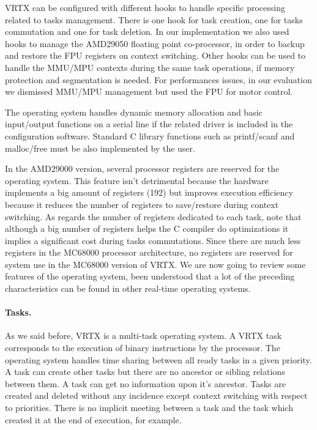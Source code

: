 \documentclass[10pt]{report}
\begin{document}
VRTX can be configured with different hooks to handle specific
processing related to tasks management. There is one hook for
task creation, one for tasks commutation and one for task
deletion. In our implementation we also used hooks to manage the
AMD29050 floating point co-processor, in order to backup and
restore the FPU registers on context switching. Other hooks can
be used to handle the MMU/MPU contexts during the same task
operations, if memory protection and segmentation is needed. For
performances issues, in our evaluation we dismissed MMU/MPU
management but used the FPU for motor control.

The operating system handles dynamic memory allocation and basic
input/output functions on a serial line if the related driver is
included in the configuration software. Standard C library
functions such as printf/scanf and malloc/free must be also
implemented by the user.

In the AMD29000 version, several processor registers are reserved
for the operating system. This feature isn't detrimental because
the hardware implements a big amount of registers (192) but
improves execution efficiency because it reduces the number of
registers to save/restore during context switching. As regards
the number of registers dedicated to each task, note that
although a big number of registers helps the C compiler do
optimizations it implies a significant cost during tasks
commutations. Since there are much less registers in the MC68000
processor architecture, no registers are reserved for system use
in the MC68000 version of VRTX. We are now going to review some
features of the operating system, been understood that a lot of
the preceding characteristics can be found in other real-time
operating systems.

\paragraph{Tasks.} As we said before, VRTX is a multi-task operating system. A VRTX
task corresponds to the execution of binary instructions by the
processor. The operating system handles time sharing between all
ready tasks in a given priority. A task can create other tasks
but there are no ancestor or sibling relations between them. A
task can get no information upon it's ancestor. Tasks are created
and deleted without any incidence except context switching with
respect to priorities. There is no implicit meeting between a task
and the task which created it at the end of execution, for example.
\end{document}
